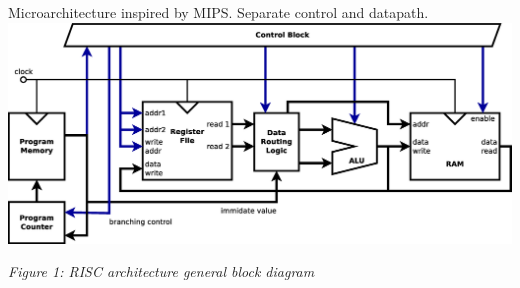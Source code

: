 \documentclass[portrait,color=UCLmidgreen,margin=1.5cm,bannerheight=8cm,logoheight=2.5cm]{uclposter}
\begin{document}
\begin{multicols}{2}

\begin{tcolorbox}[title=RISC Architecture]
	Microarchitecture inspired by MIPS. Separate control and datapath.\\[5mm]
	\includegraphics[width=\linewidth]{../resources/risc.eps}
	\begin{center}
	\textit{Figure 1: RISC architecture general block diagram}
	\end{center}
	

\end{tcolorbox}
\end{multicols}
\end{document}
